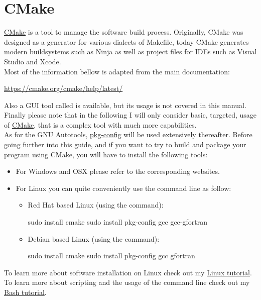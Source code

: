 \section{CMake}

\href{https://cmake.org}{CMake} is a tool to manage the software build process. 
Originally, CMake was designed as a generator for various dialects of Makefile, today CMake generates modern buildsystems such as Ninja as well as project files for IDEs such as Visual Studio and Xcode. \\
Most of the information bellow is adapted from the main documentation: 
\begin{center}\href{https://cmake.org/cmake/help/latest/}{https://cmake.org/cmake/help/latest/} \end{center}
Also a GUI tool called  is available, but its usage is not covered in this manual. \\
Finally please note that in the following I will only consider basic, targeted, usage of \href{https://cmake.org}{CMake}, that is a complex tool with much more capabilities. \\[0.25cm]
As for the GNU Autotools, \href{https://en.wikipedia.org/wiki/Pkg-config}{pkg-config} will be used extensively thereafter.  
Before going further into this guide, and if you want to try to build and package your program using CMake, you will have to install the following tools: 
\begin{itemize}
\item For Windows and OSX please refer to the corresponding websites.
\item For Linux you can quite conveniently use the command line as follow:
\begin{itemize}
\item Red Hat based Linux (using the  command):
\begin{scriptii}
\fprompt{~} sudo  install cmake
\fprompt{~} sudo  install pkg-config gcc gcc-gfortran
\end{scriptii}
\item Debian based Linux (using the  command):
\begin{scriptii}
\uprompt{~} sudo  install cmake
\uprompt{~} sudo  install pkg-config gcc gfortran
\end{scriptii}
\end{itemize}
\end{itemize}
To learn more about software installation on Linux check out my \href{https://www.ipcms.fr/wp-content/uploads/2021/11/linux.pdf}{Linux tutorial}. \\
To learn more about scripting and the usage of the command line check out my \href{https://www.ipcms.fr/wp-content/uploads/2021/05/bash.pdf}{Bash tutorial}. 

